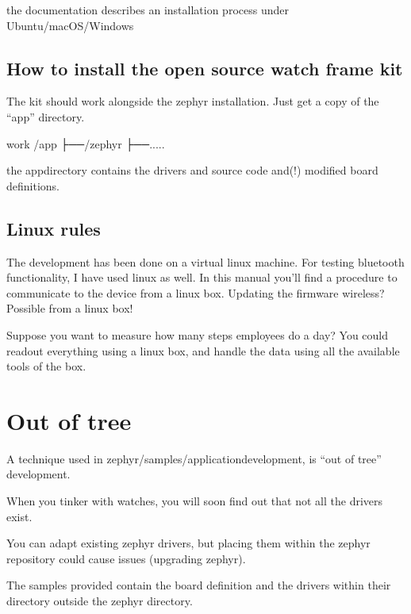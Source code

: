 \documentclass[letterpaper,10pt,english]{sphinxmanual}
\begin{document}
the documentation describes an installation process under Ubuntu/macOS/Windows


\section{How to install the open source watch frame kit}
\label{\detokenize{installation:how-to-install-the-open-source-watch-frame-kit}}
The kit should work alongside the zephyr installation.
Just get a copy of the “app” directory.

\begin{sphinxVerbatim}[commandchars=\\\{\}]
\PYGZlt{}work\PYGZgt{}  /app
     ├──/zephyr
     ├──.....
\end{sphinxVerbatim}

the app\sphinxhyphen{}directory contains the drivers and source code and(!) modified board definitions.


\section{Linux rules}
\label{\detokenize{installation:linux-rules}}
The development has been done on a virtual linux machine.
For testing bluetooth functionality, I have used linux as well.
In this manual you’ll find a procedure to communicate to the device from a linux box.
Updating the firmware wireless? Possible from a linux box!

Suppose you want to measure how many steps employees do a day?
You could readout everything using a linux box, and handle the data using all the available tools of the box.



\chapter{Out of tree}
\label{\detokenize{out-of-tree:out-of-tree}}\label{\detokenize{out-of-tree::doc}}
A technique used in zephyr/samples/application\sphinxhyphen{}development, is “out of tree” development.

When you tinker with watches, you will soon find out that not all the drivers exist.

You can adapt existing zephyr drivers, but placing them within the zephyr repository could cause issues (upgrading zephyr).

The samples provided contain the board definition and the drivers within their directory outside the zephyr directory.
\end{document}

